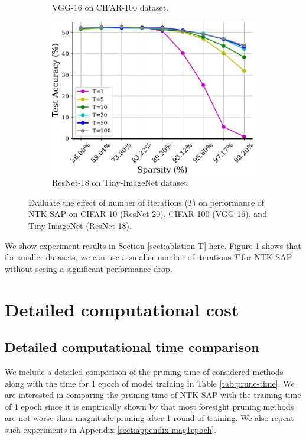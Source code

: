 \documentclass{article} %
\begin{document}
\begin{figure}[h]
\begin{subfigure}[b]{.480\textwidth}
            \caption[]%
            {{\small VGG-16 on CIFAR-100 dataset.}}    
        \end{subfigure}
        \begin{subfigure}[b]{.5\textwidth}  
            \centering
            \includegraphics[width=.95\linewidth]{plots/test_ablation.pdf}%
            \caption%
            {\small ResNet-18 on Tiny-ImageNet dataset.} 
        \end{subfigure}
        
        \caption{Evaluate the effect of number of iterations ($T$) on performance of NTK-SAP on CIFAR-10 (ResNet-20), CIFAR-100 (VGG-16), and Tiny-ImageNet (ResNet-18).} 
        \label{fig:appendix-ablation-T}
\end{figure}
We show experiment results in Section \ref{sect:ablation-T} here. Figure \ref{fig:appendix-ablation-T} shows that for smaller datasets, we can use a smaller number of iterations $T$ for NTK-SAP without seeing a significant performance drop.

\section{Detailed computational cost} \label{sect:computational-cost}
\subsection{Detailed computational time comparison} \label{sect:appendix-time}

We include a detailed comparison of the pruning time of considered methods along with the time for 1 epoch of model training in Table \ref{tab:prune-time}. We are interested in comparing the pruning time of NTK-SAP with the training time of 1 epoch since it is empirically shown by \citet{force} that most foresight pruning methods are not worse than magnitude pruning after 1 round of training. We also repeat such experiments in Appendix \ref{sect:appendix-mag1epoch}. 
\end{document}
